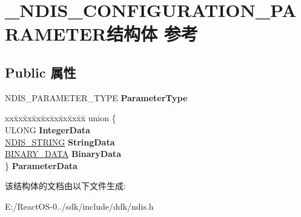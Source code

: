 \hypertarget{struct___n_d_i_s___c_o_n_f_i_g_u_r_a_t_i_o_n___p_a_r_a_m_e_t_e_r}{}\section{\+\_\+\+N\+D\+I\+S\+\_\+\+C\+O\+N\+F\+I\+G\+U\+R\+A\+T\+I\+O\+N\+\_\+\+P\+A\+R\+A\+M\+E\+T\+E\+R结构体 参考}
\label{struct___n_d_i_s___c_o_n_f_i_g_u_r_a_t_i_o_n___p_a_r_a_m_e_t_e_r}
\subsection*{Public 属性}
\begin{DoxyCompactItemize}
\item 
\mbox{\label{struct___n_d_i_s___c_o_n_f_i_g_u_r_a_t_i_o_n___p_a_r_a_m_e_t_e_r_aae0b5f9438e33c167123d9c4098f75c6}} 
N\+D\+I\+S\+\_\+\+P\+A\+R\+A\+M\+E\+T\+E\+R\+\_\+\+T\+Y\+PE {\bfseries Parameter\+Type}
\item 
\mbox{\label{struct___n_d_i_s___c_o_n_f_i_g_u_r_a_t_i_o_n___p_a_r_a_m_e_t_e_r_ad1f120cd6fc83b45adc2375e77234688}} 
\begin{tabbing}
xx\=xx\=xx\=xx\=xx\=xx\=xx\=xx\=xx\=\kill
union \{\\
\>ULONG {\bfseries IntegerData}\\
\>\hyperlink{struct___u_n_i_c_o_d_e___s_t_r_i_n_g}{NDIS\_STRING} {\bfseries StringData}\\
\>\hyperlink{struct___b_i_n_a_r_y___d_a_t_a}{BINARY\_DATA} {\bfseries BinaryData}\\
\} {\bfseries ParameterData}\\

\end{tabbing}\end{DoxyCompactItemize}


该结构体的文档由以下文件生成\+:\begin{DoxyCompactItemize}
\item 
E\+:/\+React\+O\+S-\/0../sdk/include/ddk/ndis.\+h\end{DoxyCompactItemize}
